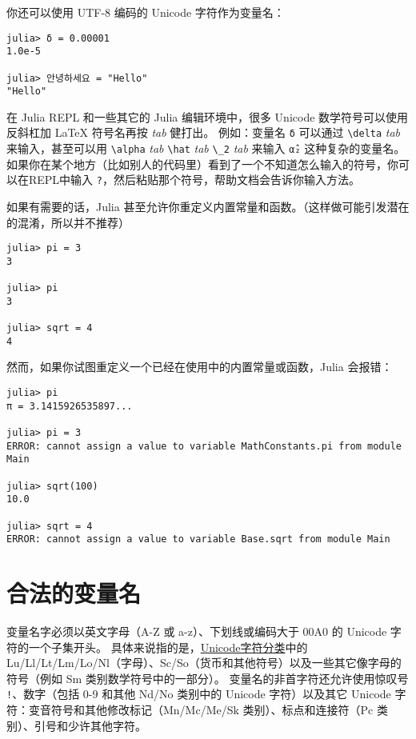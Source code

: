 你还可以使用 UTF-8 编码的 Unicode 字符作为变量名：




\begin{verbatim}
julia> δ = 0.00001
1.0e-5

julia> 안녕하세요 = "Hello"
"Hello"
\end{verbatim}



在 Julia REPL 和一些其它的 Julia 编辑环境中，很多 Unicode 数学符号可以使用反斜杠加 LaTeX 符号名再按 \emph{tab} 健打出。 例如：变量名 \texttt{δ} 可以通过 \texttt{{\textbackslash}delta} \emph{tab} 来输入，甚至可以用 \texttt{{\textbackslash}alpha} \emph{tab} \texttt{{\textbackslash}hat} \emph{tab} \texttt{{\textbackslash}\_2} \emph{tab} 来输入 \texttt{α̂₂}  这种复杂的变量名。 如果你在某个地方（比如别人的代码里）看到了一个不知道怎么输入的符号，你可以在REPL中输入 \texttt{?}，然后粘贴那个符号，帮助文档会告诉你输入方法。



如果有需要的话，Julia 甚至允许你重定义内置常量和函数。（这样做可能引发潜在的混淆，所以并不推荐）




\begin{verbatim}
julia> pi = 3
3

julia> pi
3

julia> sqrt = 4
4
\end{verbatim}



然而，如果你试图重定义一个已经在使用中的内置常量或函数，Julia 会报错：




\begin{verbatim}
julia> pi
π = 3.1415926535897...

julia> pi = 3
ERROR: cannot assign a value to variable MathConstants.pi from module Main

julia> sqrt(100)
10.0

julia> sqrt = 4
ERROR: cannot assign a value to variable Base.sqrt from module Main
\end{verbatim}



\hypertarget{8427534705431371449}{}


\section{合法的变量名}



变量名字必须以英文字母（A-Z 或 a-z）、下划线或编码大于 00A0 的 Unicode 字符的一个子集开头。 具体来说指的是，\href{http://www.fileformat.info/info/unicode/category/index.htm}{Unicode字符分类}中的 Lu/Ll/Lt/Lm/Lo/Nl（字母）、Sc/So（货币和其他符号）以及一些其它像字母的符号（例如 Sm 类别数学符号中的一部分）。 变量名的非首字符还允许使用惊叹号 \texttt{!}、数字（包括 0-9 和其他 Nd/No 类别中的 Unicode 字符）以及其它 Unicode 字符：变音符号和其他修改标记（Mn/Mc/Me/Sk 类别）、标点和连接符（Pc 类别）、引号和少许其他字符。



